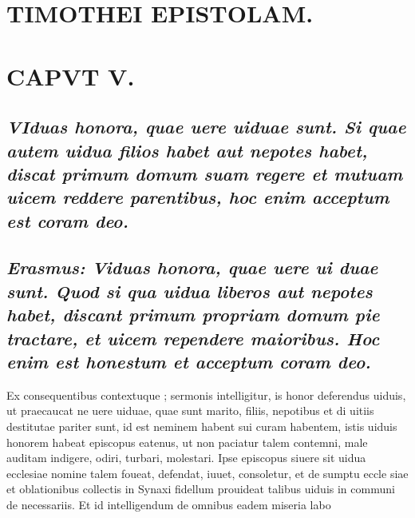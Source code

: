 \documentclass{article}
\begin{document}
\begin{pages}
\section*{TIMOTHEI EPISTOLAM. }
\marginpar{[ p.117 ]}
\endnumbering\beginnumbering\section{CAPVT V.}
{}
\subsection*{\textit{\huge\textbf{V}\normalsize Iduas honora, quae uere uiduae sunt. Si quae autem uidua filios habet aut nepotes habet, discat primum domum suam regere et mutuam uicem reddere parentibus, hoc enim acceptum est coram deo. }}
{}
\subsection*{\textit{Erasmus: Viduas honora, quae uere ui duae sunt. Quod si qua uidua liberos aut nepotes habet, discant primum propriam domum pie tractare, et uicem rependere maioribus. Hoc enim est honestum et acceptum coram deo. }}\pstart Ex consequentibus contextuque ; sermonis intelligitur, is honor deferendus uiduis, ut praecaucat ne uere uiduae, quae sunt marito, filiis, nepotibus et di uitiis destitutae pariter sunt, id est neminem habent sui curam habentem, istis uiduis honorem habeat episcopus eatenus, ut non paciatur talem contemni, male auditam indigere, odiri, turbari, molestari. Ipse episcopus siuere sit uidua ecclesiae nomine talem foueat, defendat, iuuet, consoletur, et de sumptu eccle siae et oblationibus collectis in Synaxi fidellum prouideat talibus uiduis in communi de necessariis. Et id intelligendum de omnibus eadem miseria labo\pend

\end{pages}
\end{document}
